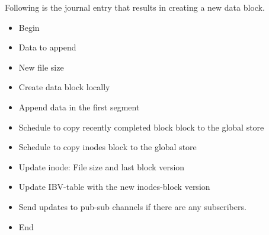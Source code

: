 \documentclass[]{article}
\begin{document}
Following is the journal entry that results in creating a new data block.

\begin{itemize}

\item Begin
\item Data to append
\item New file size
\item Create data block locally
\item Append data in the first segment
\item Schedule to copy recently completed block block to the global store
\item Schedule to copy inodes block to the global store
\item Update inode: File size and last block version
\item Update IBV-table with the new inodes-block version
\item Send updates to pub-sub channels if there are any subscribers.
\item End

\end{itemize}


%
%
%
%
%
\end{document}
